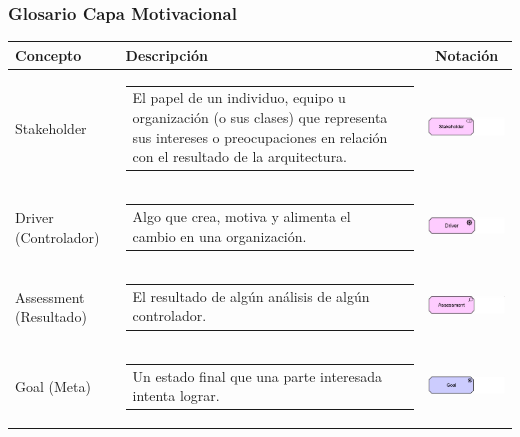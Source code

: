 \newpage

\subsubsection{Glosario Capa Motivacional}

\begin{longtable}[c]{|p{2.5cm}|l|c|}

	\hline
	\textbf{Concepto} 			& \textbf{Descripción}                                                                                                                                            & \textbf{Notación} \\ \hline
	\endhead
	Stakeholder					& \begin{tabular}[c]{p{7cm}@{}l@{}}El papel de un individuo, equipo u organización (o sus clases) que representa sus intereses o preocupaciones en relación con el resultado de la arquitectura.\end{tabular}                                                    & \includegraphics[width=35mm]{arquitectura/adm_lenguaje/imgs/motivational/Stakeholder}           \\ \hline
	Driver (Controlador)		& \begin{tabular}[c]{p{7cm}@{}l@{}}Algo que crea, motiva y alimenta el cambio en una organización.\end{tabular} & \includegraphics[width=35mm]{arquitectura/adm_lenguaje/imgs/motivational/Diver}          \\ \hline
	Assessment (Resultado)		& \begin{tabular}[c]{p{7cm}@{}l@{}}El resultado de algún análisis de algún controlador.\end{tabular} & \includegraphics[width=35mm]{arquitectura/adm_lenguaje/imgs/motivational/Assessment}          \\ \hline
	Goal (Meta)					& \begin{tabular}[c]{p{7cm}@{}l@{}}Un estado final que una parte interesada intenta lograr.\end{tabular} & \includegraphics[width=35mm]{arquitectura/adm_lenguaje/imgs/motivational/Goal}          \\ \hline

\end{longtable}
